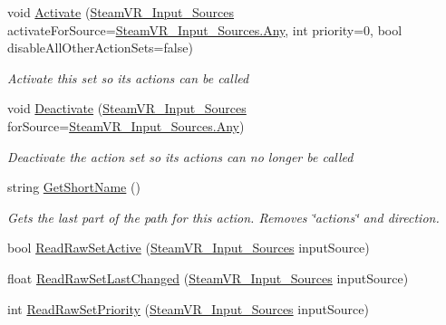 \begin{DoxyCompactItemize}
void \mbox{\hyperlink{class_valve_1_1_v_r_1_1_steam_v_r___action_set_aeabdda07095a66c6937d796713356120}{Activate}} (\mbox{\hyperlink{namespace_valve_1_1_v_r_a82e5bf501cc3aa155444ee3f0662853f}{Steam\+V\+R\+\_\+\+Input\+\_\+\+Sources}} activate\+For\+Source=\mbox{\hyperlink{namespace_valve_1_1_v_r_a82e5bf501cc3aa155444ee3f0662853faed36a1ef76a59ee3f15180e0441188ad}{Steam\+V\+R\+\_\+\+Input\+\_\+\+Sources.\+Any}}, int priority=0, bool disable\+All\+Other\+Action\+Sets=false)
\begin{DoxyCompactList}\small\item\em Activate this set so its actions can be called \end{DoxyCompactList}\item 
void \mbox{\hyperlink{class_valve_1_1_v_r_1_1_steam_v_r___action_set_ac1cf6b278cd4df49f18da3f59d8d9fc4}{Deactivate}} (\mbox{\hyperlink{namespace_valve_1_1_v_r_a82e5bf501cc3aa155444ee3f0662853f}{Steam\+V\+R\+\_\+\+Input\+\_\+\+Sources}} for\+Source=\mbox{\hyperlink{namespace_valve_1_1_v_r_a82e5bf501cc3aa155444ee3f0662853faed36a1ef76a59ee3f15180e0441188ad}{Steam\+V\+R\+\_\+\+Input\+\_\+\+Sources.\+Any}})
\begin{DoxyCompactList}\small\item\em Deactivate the action set so its actions can no longer be called \end{DoxyCompactList}\item 
string \mbox{\hyperlink{class_valve_1_1_v_r_1_1_steam_v_r___action_set_a045aa0b32ec9f9b6f65b5fcf35474250}{Get\+Short\+Name}} ()
\begin{DoxyCompactList}\small\item\em Gets the last part of the path for this action. Removes \char`\"{}actions\char`\"{} and direction. \end{DoxyCompactList}\item 
bool \mbox{\hyperlink{class_valve_1_1_v_r_1_1_steam_v_r___action_set_a212fb34fda9aa2be57a9a78e3ca6fe0f}{Read\+Raw\+Set\+Active}} (\mbox{\hyperlink{namespace_valve_1_1_v_r_a82e5bf501cc3aa155444ee3f0662853f}{Steam\+V\+R\+\_\+\+Input\+\_\+\+Sources}} input\+Source)
\item 
float \mbox{\hyperlink{class_valve_1_1_v_r_1_1_steam_v_r___action_set_afc8e7c4a2dbc8e182f34ec832bfd9b22}{Read\+Raw\+Set\+Last\+Changed}} (\mbox{\hyperlink{namespace_valve_1_1_v_r_a82e5bf501cc3aa155444ee3f0662853f}{Steam\+V\+R\+\_\+\+Input\+\_\+\+Sources}} input\+Source)
\item 
int \mbox{\hyperlink{class_valve_1_1_v_r_1_1_steam_v_r___action_set_ab43c42368df77386ea8e480817e814cb}{Read\+Raw\+Set\+Priority}} (\mbox{\hyperlink{namespace_valve_1_1_v_r_a82e5bf501cc3aa155444ee3f0662853f}{Steam\+V\+R\+\_\+\+Input\+\_\+\+Sources}} input\+Source)

\end{DoxyCompactItemize}
